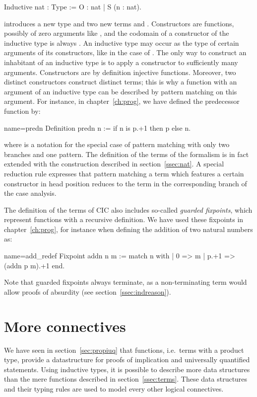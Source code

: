 \begin{coq}{}{}
Inductive nat : Type := O : nat | S (n : nat).
\end{coq}
introduces a new type  and two new terms  and
. Constructors are functions, possibly of zero
arguments like , and the codomain of a constructor of the
inductive type  is always . An inductive type may occur as
the type of certain arguments of its constructors, like in the case of
. The only way to construct an inhabitant of an
inductive type is to apply a constructor to sufficiently many
arguments. Constructors are by definition injective functions.
Moreover, two distinct constructors construct distinct
terms; this is why a function with an argument of an inductive type can be
described by pattern matching on this argument. For instance, in
chapter~\ref{ch:prog}, we have defined the predecessor function by:

\begin{coq}{name=predn}{}
Definition predn n := if n is p.+1 then p else n.
\end{coq}
where  is a notation for the special case of
pattern matching with only two branches and one pattern. The definition of
the terms of the formalism is in fact extended with the
 construction described in
section~\ref{ssec:nat}. A special reduction rule expresses that
pattern matching a term which features a certain constructor in head
position reduces to the term in the corresponding branch of the case
analysis.

The definition of the terms of CIC also includes so-called
\emph{guarded fixpoints}, which represent functions with a recursive
definition. We have used these fixpoints in chapter~\ref{ch:prog}, for
instance when defining the addition of two natural numbers as:

\begin{coq}{name=add_redef}{}
Fixpoint addn n m :=
  match n with
  | 0 => m
  | p.+1 => (addn p m).+1
  end.
\end{coq}
Note that guarded fixpoints always terminate, as a non-terminating
term would allow proofs of absurdity (see section~\ref{ssec:indreason}).

\section{More connectives}\label{sec:moreconns}
We have seen in section~\ref{sec:propiuq} that functions, i.e.~terms
with a product type, provide a datastructure for proofs of implication
and universally quantified statements.
Using inductive types, it is possible to describe more data
structures than the mere functions %
described in section~\ref{ssec:terms}. These data structures and their
typing rules are used to model every other logical connectives.


